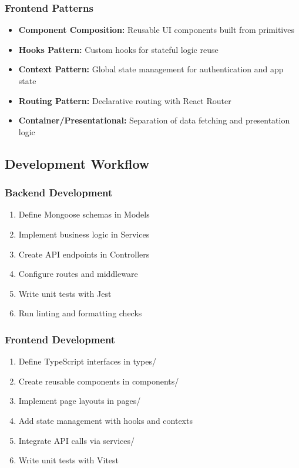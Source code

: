 \subsubsection{Frontend Patterns}
\begin{itemize}
\item \textbf{Component Composition:} Reusable UI components built from primitives
\item \textbf{Hooks Pattern:} Custom hooks for stateful logic reuse
\item \textbf{Context Pattern:} Global state management for authentication and app state
\item \textbf{Routing Pattern:} Declarative routing with React Router
\item \textbf{Container/Presentational:} Separation of data fetching and presentation logic
\end{itemize}

\subsection{Development Workflow}

\subsubsection{Backend Development}
\begin{enumerate}
\item Define Mongoose schemas in Models
\item Implement business logic in Services
\item Create API endpoints in Controllers
\item Configure routes and middleware
\item Write unit tests with Jest
\item Run linting and formatting checks
\end{enumerate}

\subsubsection{Frontend Development}
\begin{enumerate}
\item Define TypeScript interfaces in types/
\item Create reusable components in components/
\item Implement page layouts in pages/
\item Add state management with hooks and contexts
\item Integrate API calls via services/
\item Write unit tests with Vitest
\end{enumerate}